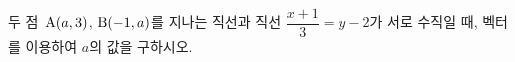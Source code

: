 두 점~$\mathrm{A}(a{,}\mkern3mu\mathopen{}3)$, $\mathrm{B}(-1{,}\mkern3mu\mathopen{}a)$를 지나는 직선과 직선 $\dfrac{x+1}{3}=y-2$가 서로 수직일 때, 벡터를 이용하여 $a$의 값을 구하시오.

